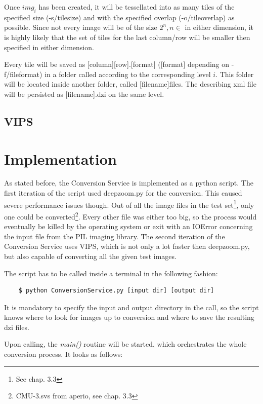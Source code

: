 Once $img_i$ has been created, it will be tessellated into as many tiles of the specified size (-s/tile{\textunderscore}size) and with the specified overlap (-o/tile{\textunderscore}overlap) as possible. Since not every image will be of the size $2^n, n \in $ in either dimension, it is highly likely that the set of tiles for the last column/row will be smaller then specified in either dimension.

Every tile will be saved as [column]{\textunderscore}[row].[format] ([format] depending on -f/file{\textunderscore}format) in a folder called according to the corresponding level $i$. This folder will be located inside another folder, called [filename]{\textunderscore}files. The describing xml file will be persisted as [filename].dzi on the same level.


\subsection{VIPS}




\section{Implementation}

As stated before, the Conversion Service is implemented as a python script. The first iteration of the script used deepzoom.py for the conversion. This caused severe performance issues though. Out of all the image files in the test set\footnote{See chap. 3.3}, only one could be converted\footnote{CMU-3.svs from aperio, see chap. 3.3}. Every other file was either too big, so the process would eventually be killed by the operating system or exit with an IOError concerning the input file from the PIL imaging library. The second iteration of the Conversion Service uses VIPS, which is not only a lot faster then deepzoom.py, but also capable of converting all the given test images.

The script has to be called inside a terminal in the following fashion:

\begin{lstlisting}
	$ python ConversionService.py [input dir] [output dir]
\end{lstlisting}

It is mandatory to specify the input and output directory in the call, so the script knows where to look for images up to conversion and where to save the resulting dzi files.

Upon calling, the \emph{main()} routine will be started, which orchestrates the whole conversion process. It looks as follows:

